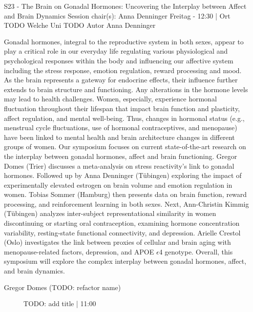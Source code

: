 
            \begin{symposium}
            {S23 - The Brain on Gonadal Hormones: Uncovering the Interplay between Affect and Brain Dynamics}
            {Session chair(s): Anna Denninger}
            {Freitag  - 12:30 | Ort TODO}
            {Welche Uni TODO}
            Autor Anna Denninger

Gonadal hormones, integral to the reproductive system in both sexes, appear to play a critical role in our everyday life regulating various physiological and psychological responses within the body and influencing our affective system including the stress response, emotion regulation, reward processing and mood. As the brain represents a gateway for endocrine effects, their influence further extends to brain structure and functioning. Any alterations in the hormone levels may lead to health challenges. Women, especially, experience hormonal fluctuation throughout their lifespan that impact brain function and plasticity, affect regulation, and mental well-being. Thus, changes in hormonal status (e.g., menstrual cycle fluctuations, use of hormonal contraceptives, and menopause) have been linked to mental health and brain architecture changes in different groups of women. Our symposium focuses on current state-of-the-art research on the interplay between gonadal hormones, affect and brain functioning. Gregor Domes (Trier) discusses a meta-analysis on stress reactivity’s link to gonadal hormones. Followed up by Anna Denninger (Tübingen) exploring the impact of experimentally elevated estrogen on brain volume and emotion regulation in women. Tobias Sommer (Hamburg) then presents data on brain function, reward processing, and reinforcement learning in both sexes. Next, Ann-Christin Kimmig (Tübingen) analyzes inter-subject representational similarity in women discontinuing or starting oral contraception, examining hormone concentration variability, resting-state functional connectivity, and depression. Arielle Crestol (Oslo) investigates the link between proxies of cellular and brain aging with menopause-related factors, depression, and APOE $\epsilon$4 genotype. Overall, this symposium will explore the complex interplay between gonadal hormones, affect, and brain dynamics.
            \begin{description}    
            
                \item [Gregor Domes (TODO: refactor name)] TODO: add title \textcolor{mygray}{ | 11:00}    
                

\end{description}
\end{symposium}
